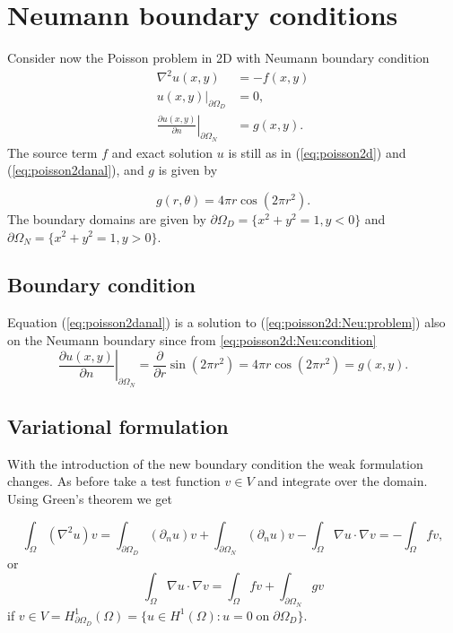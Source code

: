 \documentclass[paper=a4, fontsize=11pt]{scrartcl} %
\begin{document}
\section{Neumann boundary conditions}
Consider now the Poisson problem in 2D with Neumann boundary condition
\begin{equation}
\begin{aligned}
\nabla^2u(x,y) 	&= -f(x,y) \\
\left. u(x,y)\right|_{\partial\Omega_D} 	&= 0, \\
\left. \frac{\partial u(x,y)}{\partial n}\right|_{\partial\Omega_N} &= g(x,y).
\end{aligned}
\label{eq:poisson2d:Neu:problem}
\end{equation}
The source term $f$ and exact solution $u$ is still as in (\ref{eq:poisson2d}) and (\ref{eq:poisson2danal}), and $g$ is given by

\begin{equation}
g(r,\theta) =4\pi r\cos(2\pi r^2).
\label{eq:poisson2d:Neu:condition}
\end{equation}
The boundary domains are given by $\partial\Omega_D = \{x^2+y^2=1,y<0\}$ and $\partial\Omega_N = \{x^2+y^2=1,y>0\}$.

\subsection{Boundary condition}
Equation (\ref{eq:poisson2danal}) is a solution to (\ref{eq:poisson2d:Neu:problem}) also on the Neumann boundary since from \eqref{eq:poisson2d:Neu:condition}
\[\left. \frac{\partial u(x,y)}{\partial n}\right|_{\partial\Omega_N} = \frac{\partial}{\partial r} \sin(2\pi r^2) = 4\pi r\cos(2\pi r^2) = g(x,y).\]
\subsection{Variational formulation}
With the introduction of the new boundary condition the weak formulation changes. As before take a test function $v\in V$ and integrate over the domain. Using Green's theorem we get

\[\int_{\Omega}  (\nabla^2u)v = \int_{\partial\Omega_D} (\partial_n u) v + \int_{\partial\Omega_N} (\partial_n u) v-\int_{\Omega} \nabla u \cdot \nabla v = -\int_{\Omega} f v,\]
or 
\[\int_{\Omega} \nabla u \cdot \nabla v = \int_{\Omega} f v +  \int_{\partial\Omega_N} \! g v\]
if $v\in V= H^1_{\partial\Omega_D}(\Omega) = \{u\in H^1(\Omega) : u=0 \; \mathrm{on} \;  \partial\Omega_D\}$.
\end{document}
